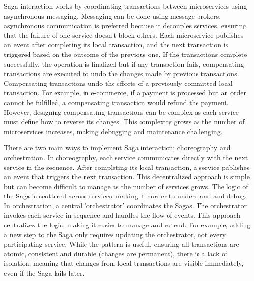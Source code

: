 \documentclass[]{final}
\begin{document}
Saga interaction works by coordinating transactions between microservices using
asynchronous messaging.
Messaging can be done using message brokers; asynchronous communication is
preferred because it decouples services, ensuring that the failure of one
service doesn’t block others. %
Each microservice publishes an event after completing its local transaction,
and the next transaction is triggered based on the outcome of the previous
one. If the transactions complete successfully, the operation is finalized
but if any transaction fails, compensating transactions are executed to
undo the changes made by previous transactions. %
Compensating transactions undo the effects of a previously committed local
transaction. For example, in e-commerce, if a payment is processed but an
order cannot be fulfilled, a compensating transaction would refund the
payment. However, designing compensating transactions can be complex as each
service must define how to reverse its changes. This complexity grows as
the number of microservices increases, making debugging and maintenance
challenging.

There are two main ways to implement Saga interaction; choreography and
orchestration. In choreography, each service communicates directly with the
next service in the sequence. After completing its local transaction, a
service publishes an event that triggers the next transaction. This
decentralized approach is simple but can become difficult to manage as the
number of services grows. The logic of the Saga is scattered across
services, making it harder to understand and debug. %
In orchestration, a central 'orchestrator' coordinates the Sagas. The orchestrator
invokes each service in sequence and handles the flow of events. This approach
centralizes the logic, making it easier to manage and extend. For example,
adding a new step to the Saga only requires updating the orchestrator,
not every participating service. %
While the pattern is useful, ensuring all transactions are atomic, consistent and
durable (changes are permanent), there is a lack of isolation, meaning that
changes from local transactions are visible immediately, even if the Saga fails
later.
\end{document}
